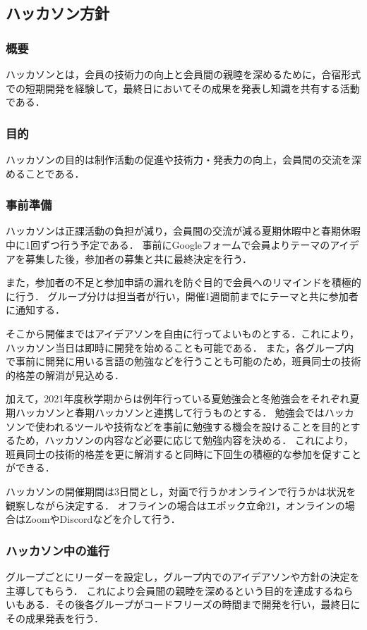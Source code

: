 \subsection*{ハッカソン方針}


\subsubsection*{概要}
ハッカソンとは，会員の技術力の向上と会員間の親睦を深めるために，合宿形式での短期開発を経験して，最終日においてその成果を発表し知識を共有する活動である．

\subsubsection*{目的}
ハッカソンの目的は制作活動の促進や技術力・発表力の向上，会員間の交流を深めることである．

\subsubsection*{事前準備}
ハッカソンは正課活動の負担が減り，会員間の交流が減る夏期休暇中と春期休暇中に1回ずつ行う予定である．
事前にGoogleフォームで会員よりテーマのアイデアを募集した後，参加者の募集と共に最終決定を行う．

また，参加者の不足と参加申請の漏れを防ぐ目的で会員へのリマインドを積極的に行う．
グループ分けは担当者が行い，開催1週間前までにテーマと共に参加者に通知する．

そこから開催まではアイデアソンを自由に行ってよいものとする．これにより，ハッカソン当日は即時に開発を始めることも可能である．
また，各グループ内で事前に開発に用いる言語の勉強などを行うことも可能のため，班員同士の技術的格差の解消が見込める．

加えて，2021年度秋学期からは例年行っている夏勉強会と冬勉強会をそれぞれ夏期ハッカソンと春期ハッカソンと連携して行うものとする．
勉強会ではハッカソンで使われるツールや技術などを事前に勉強する機会を設けることを目的とするため，ハッカソンの内容など必要に応じて勉強内容を決める．
これにより，班員同士の技術的格差を更に解消すると同時に下回生の積極的な参加を促すことができる．


ハッカソンの開催期間は3日間とし，対面で行うかオンラインで行うかは状況を観察しながら決定する．
オフラインの場合はエポック立命21，オンラインの場合はZoomやDiscordなどを介して行う．

\subsubsection*{ハッカソン中の進行}
グループごとにリーダーを設定し，グループ内でのアイデアソンや方針の決定を主導してもらう．
これにより会員間の親睦を深めるという目的を達成するねらいもある．その後各グループがコードフリーズの時間まで開発を行い，最終日にその成果発表を行う．

